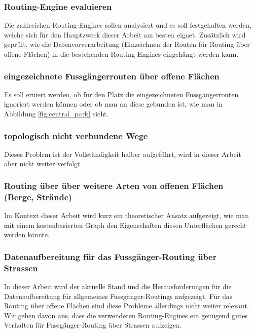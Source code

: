 \subsubsection{Routing-Engine evaluieren}
\label{target:Routing-Enginge evaluieren}
Die zahlreichen Routing-Engines sollen analysiert und es soll festgehalten werden, welche sich für den Hauptzweck dieser Arbeit am besten eignet. Zusätzlich wird geprüft, wie die Datenvorverarbeitung (Einzeichnen der Routen für Routing über offene Flächen) in die bestehenden Routing-Engines eingehängt werden kann.

\subsubsection{eingezeichnete Fussgängerrouten über offene Flächen}
\label{target:eingezeichnete Fussgängerrouten über offene Flächen}
Es soll eruiert werden, ob für den Platz die eingezeichneten Fussgängerrouten ignoriert werden können oder ob man an diese gebunden ist, wie man in Abbildung \ref{fig:central_park} sieht.

\subsubsection{topologisch nicht verbundene Wege}
\label{target:topologisch nicht verbundene Wege}
Dieses Problem ist der Vollständigkeit halber aufgeführt, wird in dieser Arbeit aber nicht weiter verfolgt.

\subsubsection{Routing über über weitere Arten von offenen Flächen (Berge, Strände)}
\label{target:Routing über über weitere Arten von offenen Flächen (Berge, Strände)}
Im Kontext dieser Arbeit wird kurz ein theoretischer Ansatz aufgezeigt, wie man mit einem kostenbasierten Graph den Eigenschaften diesen Unterflächen gerecht werden könnte.

\subsubsection{Datenaufbereitung für das Fussgänger-Routing über Strassen}
\label{target:Datenaufbereitung für das Fussgänger-Routing über Strassen}

In dieser Arbeit wird der aktuelle Stand und die Herausforderungen für die Datenaufbereitung für allgemeines Fussgänger-Routings aufgezeigt. Für das Routing über offene Flächen sind diese Probleme allerdings nicht weiter relevant. Wir gehen davon aus, dass die verwendeten Routing-Engines ein genügend gutes Verhalten für Fussgänger-Routing über Strassen aufzeigen.

